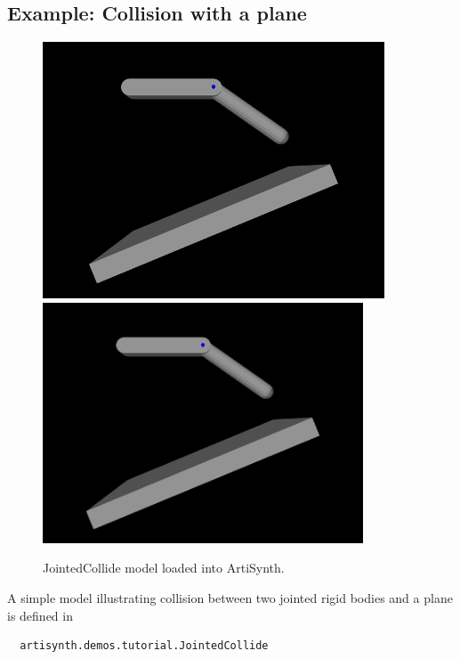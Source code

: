 \subsection{Example: Collision with a plane}
\label{JointedCollide:sec}

\begin{figure}[ht]
\begin{center}
\iflatexml
 \includegraphics[]{images/JointedCollide}
\else
 \includegraphics[width=3.75in]{images/JointedCollide}
\fi
\end{center}
\caption{JointedCollide model loaded into ArtiSynth.}
\label{JointedCollide:fig}
\end{figure}

A simple model illustrating collision between two jointed rigid bodies
and a plane is defined in
%
\begin{verbatim}
  artisynth.demos.tutorial.JointedCollide
\end{verbatim}
%

